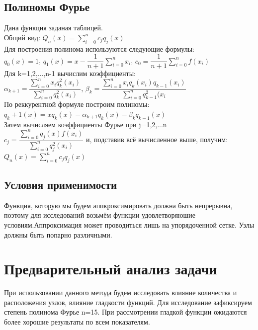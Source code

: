 \documentclass[a4paper]{article}
\begin{document}
\subsection{Полиномы Фурье} 
Дана функция заданая таблицей. \\
Общий вид: $Q_n(x)=\sum_{i=0}^n c_j q_j(x)$\\
Для построения полинома используются следующие формулы:\\
$q_0(x)=1$, $q_1(x)=x-\dfrac{1}{n+1}\sum_{i=0}^n x_i$,    $c_0=\dfrac{1}{n+1}\sum_{i=0}^n f(x_i)$\\
Для k=1,2,...,n-1 вычислим коэффициенты:\\
$\alpha_{k+1}=\dfrac{\sum_{i=0}^nx_i q_k^2(x_i)}{\sum_{i=0}^nq_k^2(x_i)}$, $\beta_k=\dfrac{\sum_{i=0}^n x_i q_k(x_i)q_{k-1}(x_i)}{\sum_{i=0}^n q^2_{k-1}(x_i} $\\
По реккурентной формуле построим полиномы:\\
$q_k+1(x)=xq_k(x)-\alpha_{k+1}q_k(x)-\beta_k q_{k-1}(x)$\\
Затем вычисляем коэффициенты Фурье при j=1,2,...n\\
$c_j=\dfrac{\sum_{i=0}^n q_j(x)f(x_i)}{\sum_{i=0}^n q_j^2(x_i)}$ и, подставив всё вычисленное выше, получим:\\
$Q_n(x)=\sum_{i=0}^n c_j q_j(x)$\\

\subsection{Условия применимости}
Функция, которую мы будем аппкроксимировать должна быть непрерывна, поэтому для исследований возьмём функции удовлетворяюшие условиям.Аппроксимация может проводиться лишь на упорядоченной сетке.  Узлы должны быть попарно различными.


 
\section{Предварительный анализ задачи}  
При использовании данного метода будем исследовать влияние количества и расположения узлов, влияние гладкости функций. Для исследование зафиксируем степень полинома Фурье n=15. При рассмотрении гладкой функции ожидаются более хорошие результаты по всем показателям.
\end{document}
